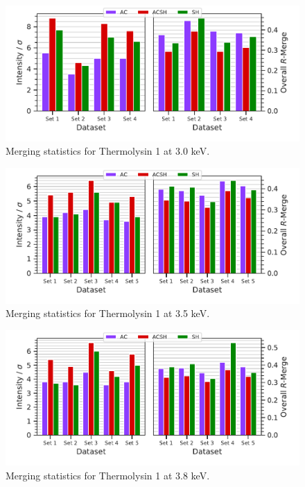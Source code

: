 \newpage

\begin{figure}
    \centering
    \includegraphics{plots/exp1/tlys_9_P6122/3p0_stats_grid.pdf}
    \caption{Merging statistics for Thermolysin 1 at 3.0 \unit{keV}.}
    \label{fig:tlys_9_3p0}
\end{figure}

\begin{figure}
    \centering
    \includegraphics{plots/exp1/tlys_9_P6122/3p5_stats_grid.pdf}
    \caption{Merging statistics for Thermolysin 1 at 3.5 \unit{keV}.}
    \label{fig:tlys_9_3p5}
\end{figure}

\begin{figure}
    \centering
    \includegraphics{plots/exp1/tlys_9_P6122/3p8_stats_grid.pdf}
    \caption{Merging statistics for Thermolysin 1 at 3.8 \unit{keV}.}
    \label{fig:tlys_9_3p8}
\end{figure}

